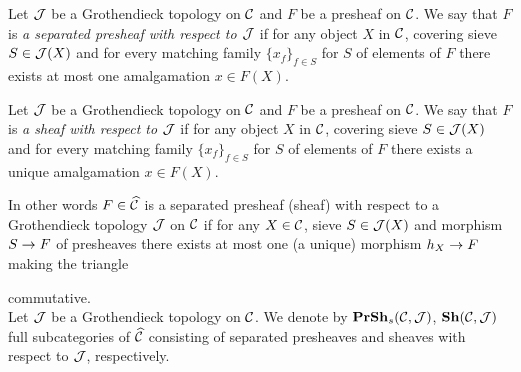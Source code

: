 \begin{definition}
Let ${\mathcal J}$ be a Grothendieck topology on ${\mathcal C}$ and $F$ be a presheaf on ${\mathcal C}$. We say that $F$ is \textit{a separated presheaf with respect to ${\mathcal J}$} if for any object $X$ in ${\mathcal C}$, covering sieve $S\in {\mathcal J}(X)$ and for every matching family $\{x_f\}_{f\in S}$ for $S$ of elements of $F$ there exists at most one amalgamation $x\in F(X)$.
\end{definition} 

\begin{definition}
Let ${\mathcal J}$ be a Grothendieck topology on ${\mathcal C}$ and $F$ be a presheaf on ${\mathcal C}$. We say that $F$ is \textit{a sheaf with respect to ${\mathcal J}$} if for any object $X$ in ${\mathcal C}$, covering sieve $S\in {\mathcal J}(X)$ and for every matching family $\{x_f\}_{f\in S}$ for $S$ of elements of $F$ there exists a unique amalgamation $x\in F(X)$.
\end{definition}
\noindent
In other words $F\in \widehat{{\mathcal C}}$ is a separated presheaf (sheaf) with respect to a Grothendieck topology ${\mathcal J}$ on ${\mathcal C}$ if for any $X\in {\mathcal C}$, sieve $S\in {\mathcal J}(X)$ and morphism $S\rightarrow F$ of presheaves there exists at most one (a unique) morphism $h_X\rightarrow F$ making the triangle 
\begin{center}
\end{center}
commutative.\\
Let ${\mathcal J}$ be a Grothendieck topology on ${\mathcal C}$. We denote by $\mathbf{PrSh}_s({\mathcal C},{\mathcal J})$, $\mathbf{Sh}({\mathcal C},{\mathcal J})$  full subcategories of $\widehat{{\mathcal C}}$ consisting of separated presheaves and sheaves with respect to ${\mathcal J}$, respectively.

